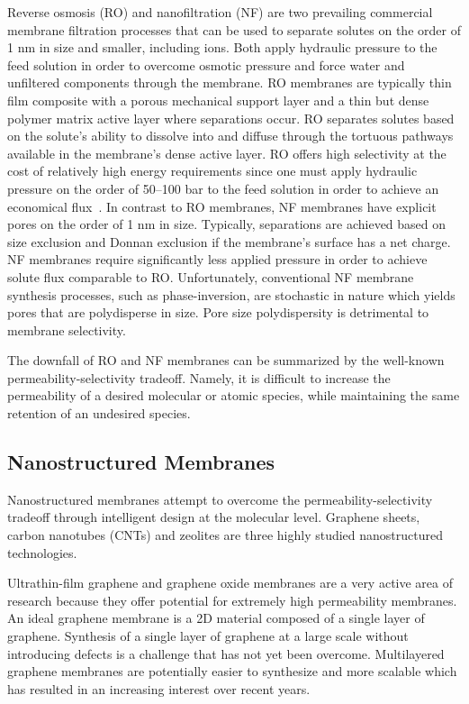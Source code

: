 \documentclass{article}
\begin{document}
  Reverse osmosis (RO) and nanofiltration (NF) are two prevailing commercial membrane
  filtration processes that can be used to separate solutes on the order of
  1 nm in size and smaller, including ions. Both apply hydraulic pressure 
  to the feed solution in order to overcome osmotic pressure and force water
  and unfiltered components through the membrane. RO membranes are typically
  thin film composite with a porous mechanical support layer and a thin but
  dense polymer matrix active layer where separations occur.\cite{jeong_interfacial_2007}
  RO separates solutes based on the solute's ability to dissolve into and 
  diffuse through the tortuous pathways available in the membrane's dense 
  active layer. RO offers high selectivity at the cost of relatively high 
  energy requirements since one must apply hydraulic pressure on the order of
  50--100 bar to the feed solution in order to achieve an economical flux~\cite{van_der_bruggen_review_2003}.
  In contrast to RO membranes, NF membranes have explicit pores on the order
  of 1 nm in size. Typically, separations are achieved based on size exclusion
  and Donnan exclusion if the membrane's surface has a net charge.~\cite{donnan_theory_1995}
  NF membranes require significantly less applied pressure in order to achieve solute flux
  comparable to RO. Unfortunately, conventional NF membrane synthesis processes, such as 
  phase-inversion\cite{smolders_microstructures_1992}, are stochastic in
  nature which yields pores that are polydisperse in size.\cite{werber_materials_2016}
  Pore size polydispersity is detrimental to membrane selectivity.
  
  The downfall of RO and NF membranes can be summarized by the well-known
  permeability-selectivity tradeoff. Namely, it is difficult to increase the
  permeability of a desired molecular or atomic species, while maintaining
  the same retention of an undesired species.\cite{werber_materials_2016}  
  
  \subsection*{Nanostructured Membranes}
  
  Nanostructured membranes attempt to overcome the permeability-selectivity 
  tradeoff through intelligent design at the molecular level. Graphene sheets, 
  carbon nanotubes (CNTs) and zeolites are three highly studied nanostructured
  technologies.
  
  Ultrathin-film graphene and graphene oxide membranes are a very active
  area of research because they offer potential for extremely high 
  permeability membranes. An ideal graphene membrane is a 2D material 
  composed of a single layer of graphene.\cite{humplik_nanostructured_2011}
  Synthesis of a single layer of graphene at a large scale without introducing
  defects is a challenge that has not yet been overcome. Multilayered graphene
  membranes are potentially easier to synthesize and more scalable which has 
  resulted in an increasing interest over recent years.\cite{cohen-tanugi_multilayer_2016,wei_multilayered_2018}
  
\end{document}
